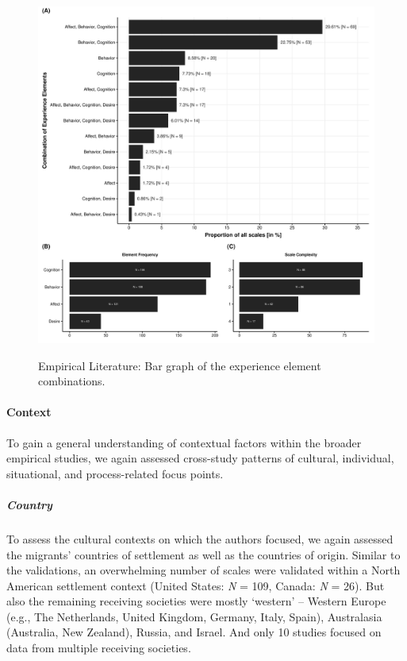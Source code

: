 \begin{figure}[h]
\centering
\caption{Empirical Literature: Bar graph of the experience element combinations.}
\includegraphics[width=\textwidth]{Figures/EmpPlotFreq-1}
\label{fig:EmpPlotFreq-1}
\end{figure}



\paragraph{Context}

To gain a general understanding of contextual factors within the broader
empirical studies, we again assessed cross-study patterns of cultural,
individual, situational, and process-related focus points.

\subparagraph{Country}

To assess the cultural contexts on which the authors focused, we again
assessed the migrants' countries of settlement as well as the countries
of origin. Similar to the validations, an overwhelming number of scales
were validated within a North American settlement context (United
States: \textit{N} = 109, Canada: \textit{N} = 26). But also the
remaining receiving societies were mostly `western' -- Western Europe
(e.g., The Netherlands, United Kingdom, Germany, Italy, Spain),
Australasia (Australia, New Zealand), Russia, and Israel. And only 10
studies focused on data from multiple receiving societies.

